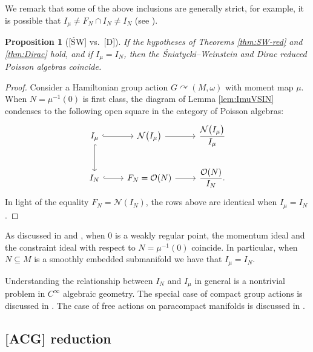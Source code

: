 \documentclass[10pt,a4paper]{amsart}
\numberwithin{equation}{section}
\newtheorem{Proposition}[Theorem]{Proposition}
 { \theoremstyle{definition}
\newtheorem{Definition}[Theorem]{Definition}
\newtheorem{Note}[Theorem]{Note}
\newtheorem{Example}[Theorem]{Example}
\newtheorem{Remark}[Theorem]{Remark} }
\DeclareMathOperator{\action}{\curvearrowright}
\renewcommand{\subset}{\subseteq}
\begin{document}
We remark that some of the above inclusions are generally strict, for example, it is possible that $I_{\mu}\neq F_N\cap I_N \neq I_{N}$ (see \cite[Section~7]{ArmsGotayJennings90}).

\begin{Proposition}[{[\'SW] vs.\ [D]}]
	If the hypotheses of Theorems {\rm \ref{thm:SW-red}} and {\rm \ref{thm:Dirac}} hold, and if $I_\mu= I_N$, then the \'Sniatycki--Weinstein and Dirac reduced Poisson algebras coincide.
\end{Proposition}

\begin{proof}
	Consider a Hamiltonian group action $G\action (M,\omega)$ with moment map $\mu$.
	When $N=\mu^{-1}(0)$ is first class, the diagram of Lemma \ref{lem:ImuVSIN} condenses to the following open square in the category of Poisson algebras:
	\begin{displaymath}
		\begin{tikzcd}
			I_\mu \ar[r,hook] \ar[d,hook]&
			\mathcal{N}\bigl(I_\mu\bigr) \ar[r] &
			\dfrac{\mathcal{N}\bigl(I_\mu\bigr)}{I_\mu}
			\\
			I_N\ar[r,hook] &
			F_N = \mathcal{O}(N) \ar[r] &
			\dfrac{\mathcal{O}(N)}{I_N}.
		\end{tikzcd}
	\end{displaymath}
	In light of the equality $F_N = \mathcal{N}(I_N)$, the rows above are identical when $I_\mu=I_N$.
\end{proof}

\begin{Remark}[on the technical condition $I_\mu = I_N $]
	As discussed in \cite[Theorem~1]{SniatyckiWeinstein83} and \cite[Corollary~6.2]{ArmsGotayJennings90}, when $0$ is a weakly regular point, the momentum ideal and the constraint ideal with respect to $N=\mu^{-1}(0)$ coincide.
	In particular, when $N\subset M$ is a smoothly embedded submanifold we have that $I_\mu=I_N$.
	
	Understanding the relationship between $I_N$ and $I_\mu$ in general is a nontrivial problem in $C^\infty$ algebraic geometry. The special case of compact group actions is discussed in \cite[Sections~5 and~6]{ArmsGotayJennings90}. The case of free actions on paracompact manifolds is discussed in \cite[Lemma~2]{Sniatycki05}.
\end{Remark}


\subsection{{[ACG]} reduction}\label{Ssec:ACG-red}
\end{document}
